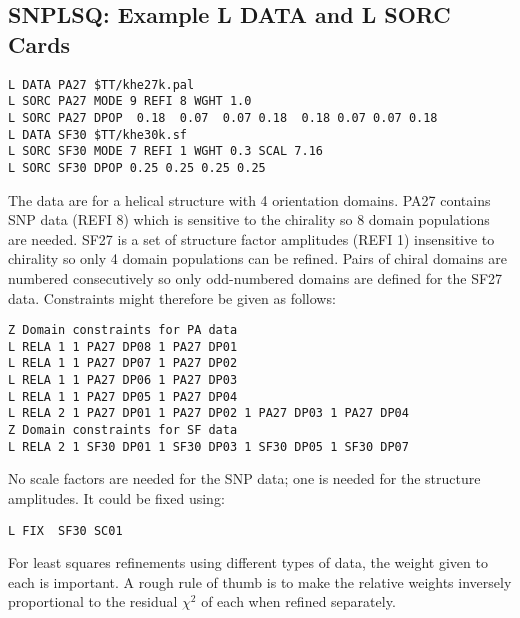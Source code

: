 \subsection{SNPLSQ: Example L DATA and L SORC Cards}  
\p\ssk\begin{verbatim} 
L DATA PA27 $TT/khe27k.pal 
L SORC PA27 MODE 9 REFI 8 WGHT 1.0 
L SORC PA27 DPOP  0.18  0.07  0.07 0.18  0.18 0.07 0.07 0.18   
L DATA SF30 $TT/khe30k.sf 
L SORC SF30 MODE 7 REFI 1 WGHT 0.3 SCAL 7.16
L SORC SF30 DPOP 0.25 0.25 0.25 0.25
\end{verbatim}
The data are for a helical structure with 4 orientation domains. PA27 contains
SNP data (REFI 8) which is sensitive to the chirality so 8 domain populations are needed.
SF27 is a set of structure factor amplitudes (REFI 1) insensitive to chirality so only 4
domain populations can be refined. Pairs of chiral domains are numbered consecutively
so only odd-numbered domains are defined for the SF27 data. Constraints might therefore be 
given as follows:
\begin{verbatim} 
Z Domain constraints for PA data
L RELA 1 1 PA27 DP08 1 PA27 DP01
L RELA 1 1 PA27 DP07 1 PA27 DP02
L RELA 1 1 PA27 DP06 1 PA27 DP03
L RELA 1 1 PA27 DP05 1 PA27 DP04
L RELA 2 1 PA27 DP01 1 PA27 DP02 1 PA27 DP03 1 PA27 DP04 
Z Domain constraints for SF data
L RELA 2 1 SF30 DP01 1 SF30 DP03 1 SF30 DP05 1 SF30 DP07  
\end{verbatim}
No scale factors are needed for the SNP data; one is needed for the structure amplitudes.
It could be fixed using:
\begin{verbatim} 
L FIX  SF30 SC01
\end{verbatim}
\p
 For least squares refinements using different types of data, the weight given
 to each is important. A rough rule of thumb is to make the relative weights
 inversely proportional to the residual $\chi^2$ of each when refined separately.
%
\finchapter
%

